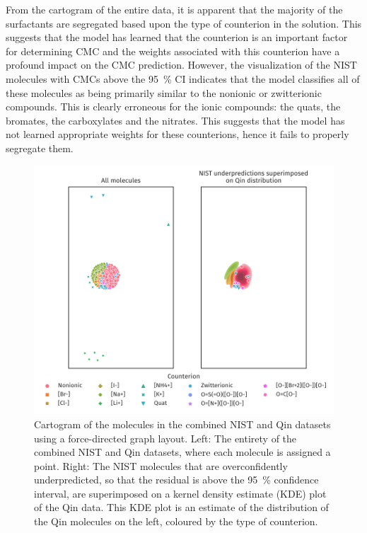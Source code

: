 From the cartogram of the entire data, it is apparent that the majority of the
surfactants are segregated based upon the type of counterion in the solution.
This suggests that the model has learned that the counterion is an important
factor for determining CMC and the weights associated with this counterion have
a profound impact on the CMC prediction. However, the visualization of the NIST
molecules with CMCs above the \SI{95}{\%} CI indicates that the model classifies
all of these molecules as being primarily similar to the nonionic or
zwitterionic compounds. This is clearly erroneous for the ionic compounds: the
quats, the bromates, the carboxylates and the nitrates. This suggests that the
model has not learned appropriate weights for these counterions, hence it fails
to properly segregate them.

\begin{figure}
    \includegraphics[width=\textwidth]{images/force-graph.pdf}
    \caption{Cartogram of the molecules in the combined NIST and Qin datasets
        using a force-directed graph layout. Left: The entirety of the combined
        NIST and Qin datasets, where each molecule is assigned a point. Right:
        The NIST molecules that are overconfidently underpredicted, so that the
        residual is above the \SI{95}{\%} confidence interval, are superimposed
        on a kernel density estimate (KDE) plot of the Qin data. This KDE plot
        is an estimate of the distribution of the Qin molecules on the left,
        coloured by the type of counterion.}
    \label{fig:fdg}
\end{figure}

